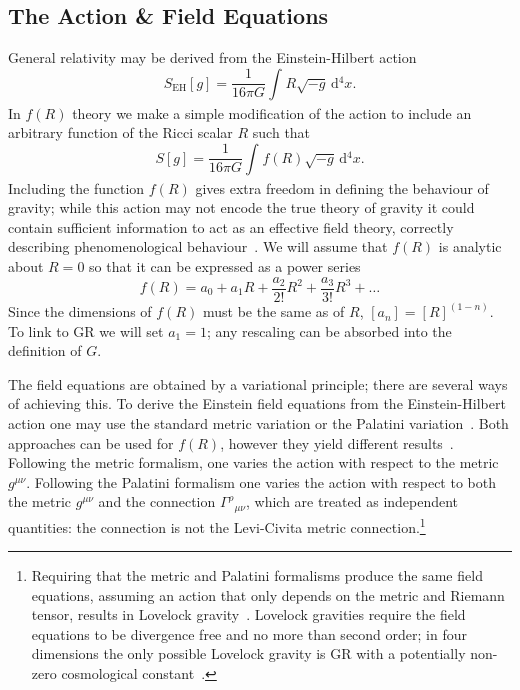 \documentclass[aps,prd,amsfonts,amssymb,amsmath,nofootinbib,reprint,showpacs]{revtex4-1}
\newcommand{\sub}[1]{\ensuremath{_\text{#1}}}
\newcommand{\dd}{\ensuremath{\text{d}}}
\newcommand{\intd}[4]{\ensuremath{\int_{#1}^{#2}{#3}\,\dd{#4}}}
\newcommand{\recip}[1]{\ensuremath{\frac{1}{#1}}}
\begin{document}
\subsection{The Action \& Field Equations\label{sec:Action}}

General relativity may be derived from the Einstein-Hilbert action~\cite{Misner1973, Landau1975}
\begin{equation}
S\sub{EH}[g] = \recip{16\pi G}\intd{}{}{R\sqrt{-g}}{^4x}.
\end{equation}
In $f(R)$ theory we make a simple modification of the action to include an arbitrary function of the Ricci scalar $R$ such that~\cite{Buchdahl1970}
\begin{equation}
S[g] = \recip{16\pi G}\intd{}{}{f(R)\sqrt{-g}}{^4x}.
\end{equation}
Including the function $f(R)$ gives extra freedom in defining the behaviour of gravity; while this action may not encode the true theory of gravity it could contain sufficient information to act as an effective field theory, correctly describing phenomenological behaviour~\cite{Park2010}. We will assume that $f(R)$ is analytic about $R = 0$ so that it can be expressed as a power series~\cite{Buchdahl1970, Capozziello2007, Clifton2008, Psaltis2008}
\begin{equation}
f(R) = a_0 + a_1 R + \frac{a_2}{2!}R^2 + \frac{a_3}{3!}R^3 + \ldots
\end{equation}
Since the dimensions of $f(R)$ must be the same as of $R$, $[a_n] = [R]^{(1-n)}$. To link to GR we will set $a_1 = 1$; any rescaling can be absorbed into the definition of $G$.

The field equations are obtained by a variational principle; there are several ways of achieving this. To derive the Einstein field equations from the Einstein-Hilbert action one may use the standard metric variation or the Palatini variation~\cite{Misner1973}. Both approaches can be used for $f(R)$, however they yield different results~\cite{Sotiriou2010, DeFelice2010}. Following the metric formalism, one varies the action with respect to the metric $g^{\mu\nu}$. Following the Palatini formalism one varies the action with respect to both the metric $g^{\mu\nu}$ and the connection ${\Gamma^\rho}_{\mu\nu}$, which are treated as independent quantities: the connection is not the Levi-Civita metric connection.\footnote{Requiring that the metric and Palatini formalisms produce the same field equations, assuming an action that only depends on the metric and Riemann tensor, results in Lovelock gravity~\cite{Exirifard2008}. Lovelock gravities require the field equations to be divergence free and no more than second order; in four dimensions the only possible Lovelock gravity is GR with a potentially non-zero cosmological constant~\cite{Lovelock1970, Lovelock1971, Lovelock1972}.}
\end{document}
